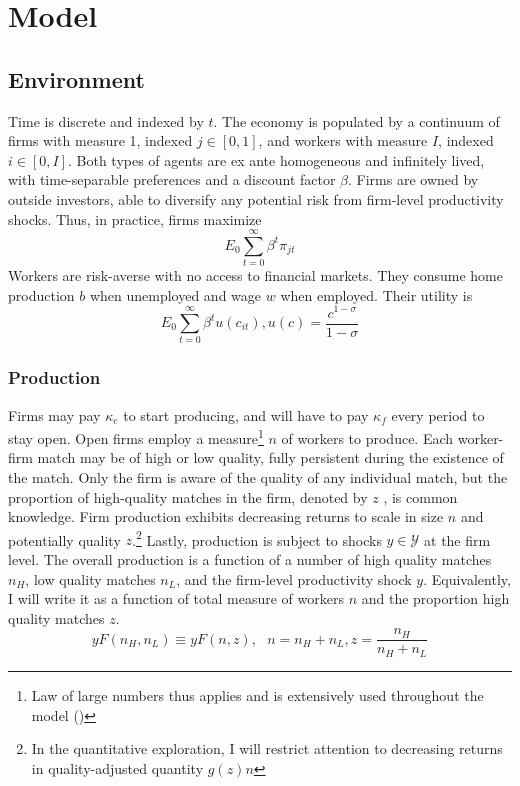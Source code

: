 \section{Model}
\subsection{Environment} %
Time is discrete and indexed by $t$. The economy is populated by a continuum of firms with measure 1, indexed $j \in [0,1]$, and workers with measure $I$, indexed $i \in [0,I]$. Both types of agents are ex ante homogeneous and infinitely lived, with time-separable preferences and a discount factor $\beta$. Firms are owned by outside investors, able to diversify any potential risk from firm-level productivity shocks. Thus, in practice, firms maximize
\[E_0 \sum_{t=0}^\infty \beta^t \pi_{jt}\]
Workers are risk-averse with no access to financial markets. They consume home production $b$ when unemployed and wage $w$ when employed. Their utility is
\[E_0 \sum_{t=0}^\infty \beta^t u(c_{it}), u(c) = \frac{c^{1-\sigma}}{1-\sigma}\]
\subsubsection*{Production}
Firms may pay $\kappa_e$ to start producing, and will have to pay $\kappa_f$ every period to stay open.
Open firms employ a measure\footnote{Law of large numbers thus applies and is extensively used throughout the model (\textcite{Sun2009})} $n$ of workers to produce. Each worker-firm match may be of high or low quality, fully persistent during the existence of the match. Only the firm is aware of the quality of any individual match, but the proportion of high-quality matches in the firm, denoted by $z$ , is common knowledge. Firm production exhibits decreasing returns to scale in size $n$ and potentially quality $z$.\footnote{In the quantitative exploration, I will restrict attention to decreasing returns in quality-adjusted quantity $g(z)n$} Lastly, production is subject to shocks $y\in \mathcal{Y}$ at the firm level. The overall production is a function of a number of high quality matches $n_H$, low quality matches $n_L$, and the firm-level productivity shock $y$. Equivalently, I will write it as a function of total measure of workers $n$ and the proportion high quality matches $z$. %
\[yF(n_H,n_L) \equiv yF(n,z),\:\:\: n=n_H+n_L,z=\frac{n_H}{n_H+n_L}\]

